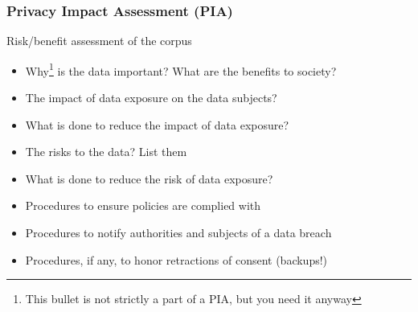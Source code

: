 \documentclass[xcolor=dvipsnames]{beamer}
\begin{document}
\begin{frame}
	\frametitle{Privacy Impact Assessment (PIA)}
	
	\begin{block}{Risk/benefit assessment of the corpus {\hspace{4.5cm}\scriptsize\cite{act2014conducting,Art29DPWP}}}
	\begin{itemize}
	\item Why\footnote[frame]{This bullet is not strictly a part of a PIA, but you need it anyway} is the data important? What are the benefits to society?
	\item The impact of data exposure on the data subjects?
	\item What is done to reduce the impact of data exposure?
	\item The risks to the data? List them
	\item What is done to reduce the risk of data exposure?
	\item Procedures to ensure policies are complied with
	\item Procedures to notify authorities and subjects of a data breach
	\item Procedures, if any, to honor retractions of consent (backups!)
	\end{itemize}
	\end{block}	
	
\end{frame}
\end{document}
